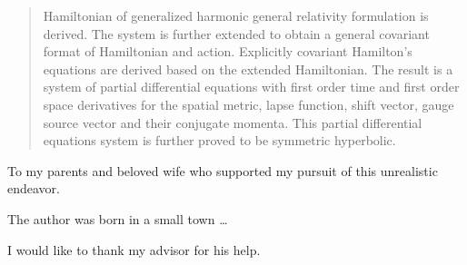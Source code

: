 \begin{abstract}
Hamiltonian of generalized harmonic general relativity formulation is derived. The system is further extended to obtain a general covariant format of Hamiltonian and action. Explicitly covariant Hamilton's equations are derived based on the extended Hamiltonian. The result is a system of partial differential equations with first order time and first order space derivatives for the spatial metric, lapse function, shift vector, gauge source vector and their conjugate momenta. This partial differential equations system is further proved to be symmetric hyperbolic.
\end{abstract}


\makecopyrightpage

\maketitlepage

\begin{dedication}
 \centering To my parents and beloved wife \break who supported my pursuit of this unrealistic endeavor. 
\end{dedication}

\begin{biography}
The author was born in a small town \ldots
\end{biography}

\begin{acknowledgements}
I would like to thank my advisor for his help.
\end{acknowledgements}


\thesistableofcontents

\thesislistoftables

\thesislistoffigures
